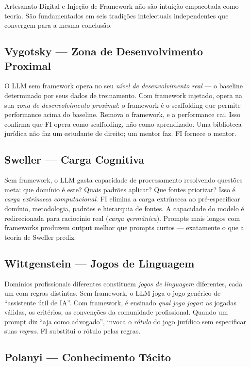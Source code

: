 \documentclass[12pt,a4paper]{article}
\begin{document}
Artesanato Digital e Injeção de Framework não são intuição empacotada como teoria. São fundamentados em seis tradições intelectuais independentes que convergem para a mesma conclusão.

\subsection{Vygotsky --- Zona de Desenvolvimento Proximal}

O LLM sem framework opera no seu \emph{nível de desenvolvimento real} --- o baseline determinado por seus dados de treinamento. Com framework injetado, opera na sua \emph{zona de desenvolvimento proximal}: o framework é o scaffolding que permite performance acima do baseline. Remova o framework, e a performance cai. Isso confirma que FI opera como scaffolding, não como aprendizado. Uma biblioteca jurídica não faz um estudante de direito; um mentor faz. FI fornece o mentor.

\subsection{Sweller --- Carga Cognitiva}

Sem framework, o LLM gasta capacidade de processamento resolvendo questões meta: que domínio é este? Quais padrões aplicar? Que fontes priorizar? Isso é \emph{carga extrínseca computacional}. FI elimina a carga extrínseca ao pré-especificar domínio, metodologia, padrões e hierarquia de fontes. A capacidade do modelo é redirecionada para raciocínio real (\emph{carga germânica}). Prompts mais longos com frameworks produzem output melhor que prompts curtos --- exatamente o que a teoria de Sweller prediz.

\subsection{Wittgenstein --- Jogos de Linguagem}

Domínios profissionais diferentes constituem \emph{jogos de linguagem} diferentes, cada um com regras distintas. Sem framework, o LLM joga o jogo genérico de ``assistente útil de IA''. Com framework, é ensinado \emph{qual jogo jogar}: as jogadas válidas, os critérios, as convenções da comunidade profissional. Quando um prompt diz ``aja como advogado'', invoca o \emph{rótulo} do jogo jurídico sem especificar suas \emph{regras}. FI substitui o rótulo pelas regras.

\subsection{Polanyi --- Conhecimento Tácito}
\end{document}
